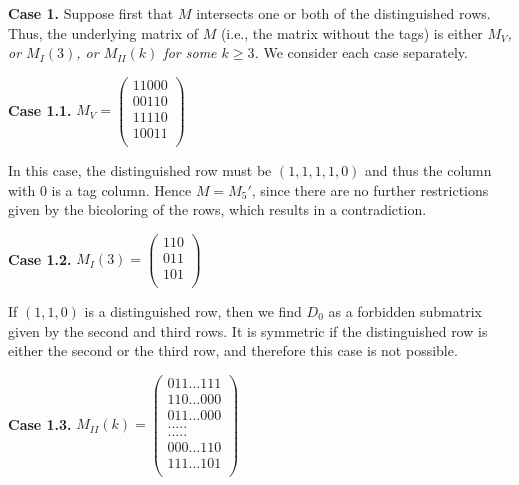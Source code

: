 \documentclass[a4paper,10pt]{report}
\theoremstyle{plain}
\theoremstyle{remark}
\theoremstyle{plain}
\begin{document}
\vspace{3mm}
{\textbf{Case 1. } Suppose first that $M$ intersects one or both of the distinguished rows. Thus, the underlying matrix of $M$ (i.e., the matrix without the tags) is either \textit{$M_V$, or $M_I(3)$, or $M_{II}(k)$ for some $k \geq 3$.} We consider each case separately. %

\vspace{2mm}
\textbf{Case 1.1. } $M_V = \begin{pmatrix}
				11000\\
				00110\\
				11110\\
				10011\\
\end{pmatrix}$


\vspace{2mm}
In this case, the distinguished row must be $(1,1,1,1,0)$ and thus the column with 0 is a tag column. 
Hence $M = M_5'$, since there are no further restrictions given by the bicoloring of the rows, which results in a contradiction. 


\vspace{2mm}
\textbf{Case 1.2. } $M_I(3) = \begin{pmatrix}
				110\\
				011\\
				101\\
\end{pmatrix}$

\vspace{2mm}

If $(1,1,0)$ is a distinguished row, then we find $D_0$ as a forbidden submatrix given by the second and third rows. It is symmetric if the distinguished row is either the second or the third row, and therefore this case is not possible.

\vspace{2mm}
\textbf{Case 1.3. } $M_{II}(k) = \begin{pmatrix}
				011...111\\
				110...000\\
				011...000\\
				.   .   .   .   . \\
				.   .   .   .   . \\
				000...110\\
				111...101\\
			\end{pmatrix}$

}
\end{document}
